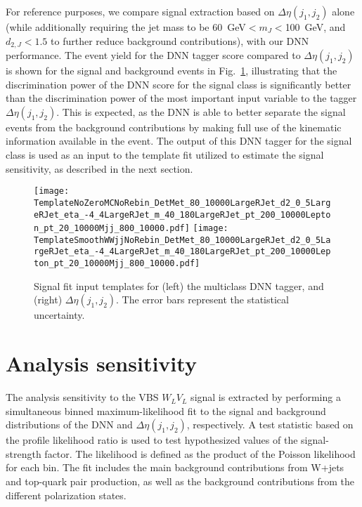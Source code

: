 \documentclass[amsmath,amssymb,aps,prd,preprint,groupedaddress]{revtex4-2}
\begin{document}
For reference purposes, we compare signal extraction based on $\Delta \eta (j_{1}, j_{2})$ alone (while additionally requiring the jet mass to be 60~GeV$ < m_{J} < $100~GeV, and $d_{2,J} < 1.5$ to further reduce background contributions), with our DNN performance. The event yield for the DNN tagger score compared to $\Delta \eta (j_{1}, j_{2})$ is shown for the signal and background events in Fig.~\ref{fig:taggerScore}, illustrating that the discrimination power of the DNN score for the signal class is significantly better than the discrimination power of the most important input variable to the tagger $\Delta \eta (j_{1}, j_{2})$. This is expected, as the DNN is able to better separate the signal events from the background contributions by making full use of the kinematic information available in the event. The output of this DNN tagger for the signal class is used as an input to the template fit utilized to estimate the signal sensitivity, as described in the next section.
\begin{figure}[thb]
 \centering
 \texttt{[image: TemplateNoZeroMCNoRebin\_DetMet\_80\_10000LargeRJet\_d2\_0\_5LargeRJet\_eta\_-4\_4LargeRJet\_m\_40\_180LargeRJet\_pt\_200\_10000Lepton\_pt\_20\_10000Mjj\_800\_10000.pdf]}
 \texttt{[image: TemplateSmoothWWjjNoRebin\_DetMet\_80\_10000LargeRJet\_d2\_0\_5LargeRJet\_eta\_-4\_4LargeRJet\_m\_40\_180LargeRJet\_pt\_200\_10000Lepton\_pt\_20\_10000Mjj\_800\_10000.pdf]}
 \caption{Signal fit input templates for (left) the multiclass DNN tagger, and (right) $\Delta \eta (j_{1}, j_{2})$.
          The error bars represent the statistical uncertainty.}
 \label{fig:taggerScore}
\end{figure}

 
\section{Analysis sensitivity}
\label{sec:sensitivity}
The analysis sensitivity to the VBS $W_{L}V_{L}$ signal is extracted by performing a simultaneous binned maximum-likelihood fit to the signal and background distributions of the DNN and $\Delta \eta (j_{1}, j_{2})$, respectively.
A test statistic based on the profile likelihood ratio is used to test hypothesized values of the signal-strength factor.
The likelihood is defined as the product of the Poisson likelihood for each bin. 
The fit includes the main background contributions from W+jets and top-quark pair production, as well as the background contributions from the different polarization states.
\end{document}
